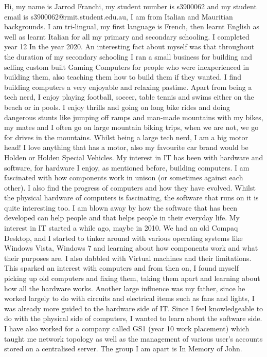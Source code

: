 \documentclass[a4paper,12pt]{extreport}
\begin{document}
	      Hi, my name is Jarrod Franchi, my student number is s3900062 and my student email is s3900062@rmit.student.edu.au, I am from Italian and Mauritian backgrounds. I am tri-lingual, my first language is French, then learnt English as well as learnt Italian for all my primary and secondary schooling. I completed year 12 In the year 2020. An interesting fact about myself was that throughout the duration of my secondary schooling I ran a small business for building and selling custom built Gaming Computers for people who were inexperienced in building them, also teaching them how to build them if they wanted. I find building computers a very enjoyable and relaxing pastime. Apart from being a tech nerd, I enjoy playing football, soccer, table tennis and swims either on the beach or in pools. I enjoy thrills and going on long bike rides and doing dangerous stunts like jumping off ramps and man-made mountains with my bikes, my mates and I often go on large mountain biking trips, when we are not, we go for drives in the mountains. Whilst being a large tech nerd, I am a big motor head! I love anything that has a motor, also my favourite car brand would be Holden or Holden Special Vehicles. My interest in IT has been with hardware and software, for hardware I enjoy, as mentioned before, building computers. I am fascinated with how components work in unison (or sometimes against each other). I also find the progress of computers and how they have evolved. Whilst the physical hardware of computers is fascinating, the software that runs on it is quite interesting too. I am blown away by how the software that has been developed can help people and that helps people in their everyday life. My interest in IT started a while ago, maybe in 2010. We had an old Compaq Desktop, and I started to tinker around with various operating systems like Windows Vista, Windows 7 and learning about how components work and what their purposes are. I also dabbled with Virtual machines and their limitations. This sparked an interest with computers and from then on, I found myself picking up old computers and fixing them, taking them apart and learning about how all the hardware works. Another large influence was my father, since he worked largely to do with circuits and electrical items such as fans and lights, I was already more guided to the hardware side of IT. Since I feel knowledgeable to do with the physical side of computers, I wanted to learn about the software side. I have also worked for a company called GS1 (year 10 work placement) which taught me network topology as well as the management of various user’s accounts stored on a centralised server. The group I am apart is In Memory of John.\newline
\end{document}
